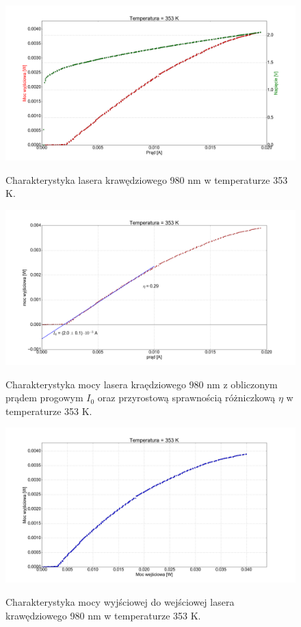 \documentclass[a4paper, portrait,12pt]{report}
\begin{document}
\begin{figure}
\center
  \includegraphics[scale=0.30]{plot980/temp_80_IVL.png}
  \label{rys1}
  \caption{Charakterystyka lasera krawędziowego 980 nm w temperaturze 353 K.} 
\end{figure}

\begin{figure}
\center
  \includegraphics[scale=0.30]{plot980/temp_80_fit.png}
  \label{rys1}
  \caption{Charakterystyka mocy lasera kraędziowego 980 nm z obliczonym prądem progowym $I_0$ oraz przyrostową sprawnością różniczkową $\eta$ w temperaturze 353 K.} 
\end{figure}

\begin{figure}
\center
  \includegraphics[scale=0.30]{plot980/temp_80_power.png}
  \label{rys1}
  \caption{Charakterystyka mocy wyjściowej do wejściowej lasera krawędziowego 980 nm w temperaturze 353 K.} 
\end{figure}
\end{document}

